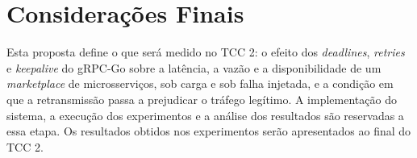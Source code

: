 \chapter{Considerações Finais}\label{cap:consideracoes}

Esta proposta define o que será medido no TCC 2: o efeito dos \textit{deadlines},
\textit{retries} e \textit{keepalive} do gRPC-Go sobre a latência, a vazão e a
disponibilidade de um \textit{marketplace} de microsserviços, sob carga e sob falha
injetada, e a condição em que a retransmissão passa a prejudicar o tráfego legítimo.
A implementação do sistema, a execução dos experimentos e a análise dos resultados
são reservadas a essa etapa. Os resultados obtidos nos experimentos serão apresentados ao final do TCC 2.
